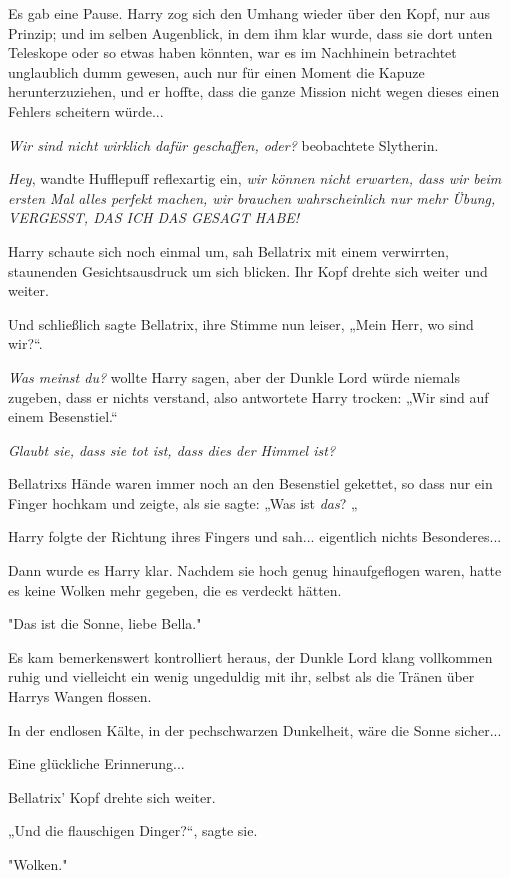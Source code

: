 {Es gab eine Pause. Harry zog sich den Umhang wieder über den Kopf, nur aus Prinzip; und im selben Augenblick, in dem ihm klar wurde, dass sie dort unten Teleskope oder so etwas haben könnten, war es im Nachhinein betrachtet unglaublich dumm gewesen, auch nur für einen Moment die Kapuze herunterzuziehen, und er hoffte, dass die ganze Mission nicht wegen dieses einen Fehlers scheitern würde...

\emph{Wir sind nicht wirklich dafür geschaffen, oder?} beobachtete Slytherin.

\emph{Hey}, wandte Hufflepuff reflexartig ein, \emph{wir können nicht erwarten, dass wir beim ersten Mal alles perfekt machen, wir brauchen wahrscheinlich nur mehr Übung, VERGESST, DAS ICH DAS GESAGT HABE!}

Harry schaute sich noch einmal um, sah Bellatrix mit einem verwirrten, staunenden Gesichtsausdruck um sich blicken. Ihr Kopf drehte sich weiter und weiter.

Und schließlich sagte Bellatrix, ihre Stimme nun leiser, „Mein Herr, wo sind wir?“.

\emph{Was meinst du?} wollte Harry sagen, aber der Dunkle Lord würde niemals zugeben, dass er nichts verstand, also antwortete Harry trocken: „Wir sind auf einem Besenstiel.“

\emph{\emph{Glaubt sie, dass sie tot ist, dass dies der Himmel ist?}}

Bellatrixs Hände waren immer noch an den Besenstiel gekettet, so dass nur ein Finger hochkam und zeigte, als sie sagte: „Was ist \emph{das}? „

Harry folgte der Richtung ihres Fingers und sah... eigentlich nichts Besonderes...

Dann wurde es Harry klar. Nachdem sie hoch genug hinaufgeflogen waren, hatte es keine Wolken mehr gegeben, die es verdeckt hätten.

"Das ist die Sonne, liebe Bella."

Es kam bemerkenswert kontrolliert heraus, der Dunkle Lord klang vollkommen ruhig und vielleicht ein wenig ungeduldig mit ihr, selbst als die Tränen über Harrys Wangen flossen.

In der endlosen Kälte, in der pechschwarzen Dunkelheit, wäre die Sonne sicher...

Eine glückliche Erinnerung...

Bellatrix' Kopf drehte sich weiter.

„Und die flauschigen Dinger?“, sagte sie.

"Wolken."

}
